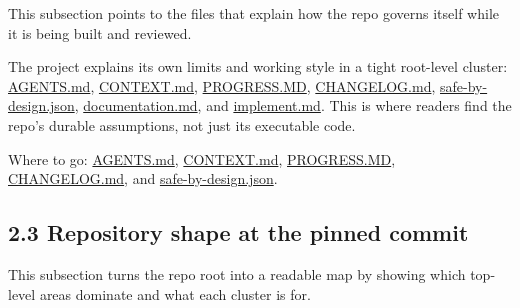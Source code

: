 This subsection points to the files that explain how the repo governs
itself while it is being built and reviewed.

The project explains its own limits and working style in a tight
root-level cluster:
\href{https://github.com/chris-page-gov/mcp-geo/blob/fe862910da246ca77f374cfbe484985f5df4d316/AGENTS.md}{AGENTS.md},
\href{https://github.com/chris-page-gov/mcp-geo/blob/fe862910da246ca77f374cfbe484985f5df4d316/CONTEXT.md}{CONTEXT.md},
\href{https://github.com/chris-page-gov/mcp-geo/blob/fe862910da246ca77f374cfbe484985f5df4d316/PROGRESS.MD}{PROGRESS.MD},
\href{https://github.com/chris-page-gov/mcp-geo/blob/fe862910da246ca77f374cfbe484985f5df4d316/CHANGELOG.md}{CHANGELOG.md},
\href{https://github.com/chris-page-gov/mcp-geo/blob/fe862910da246ca77f374cfbe484985f5df4d316/safe-by-design.json}{safe-by-design.json},
\href{https://github.com/chris-page-gov/mcp-geo/blob/fe862910da246ca77f374cfbe484985f5df4d316/documentation.md}{documentation.md},
and
\href{https://github.com/chris-page-gov/mcp-geo/blob/fe862910da246ca77f374cfbe484985f5df4d316/implement.md}{implement.md}.
This is where readers find the repo's durable assumptions, not just its
executable code.

Where to go:
\href{https://github.com/chris-page-gov/mcp-geo/blob/fe862910da246ca77f374cfbe484985f5df4d316/AGENTS.md}{AGENTS.md},
\href{https://github.com/chris-page-gov/mcp-geo/blob/fe862910da246ca77f374cfbe484985f5df4d316/CONTEXT.md}{CONTEXT.md},
\href{https://github.com/chris-page-gov/mcp-geo/blob/fe862910da246ca77f374cfbe484985f5df4d316/PROGRESS.MD}{PROGRESS.MD},
\href{https://github.com/chris-page-gov/mcp-geo/blob/fe862910da246ca77f374cfbe484985f5df4d316/CHANGELOG.md}{CHANGELOG.md},
and
\href{https://github.com/chris-page-gov/mcp-geo/blob/fe862910da246ca77f374cfbe484985f5df4d316/safe-by-design.json}{safe-by-design.json}.

\subsection{2.3 Repository shape at the pinned
commit}\label{repository-shape-at-the-pinned-commit}

This subsection turns the repo root into a readable map by showing which
top-level areas dominate and what each cluster is for.

